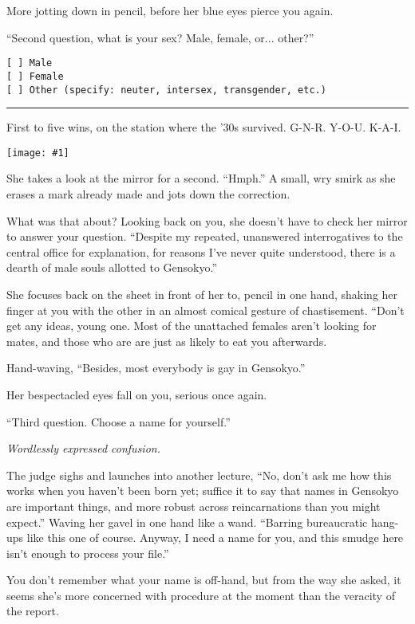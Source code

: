 \documentclass[a4paper,12pt]{book}
\newenvironment{commentary}%
	{
		\vfill%
		\hrule%
		\begin{footnotesize}%
		\color{MidnightBlue}%
	}%
	{%
		\end{footnotesize}%
	}
\newcommand{\img}[1]{%
	\texttt{[image: \#1]}%
}
\begin{document}
More jotting down in pencil, before her blue eyes pierce you again.

``Second question, what is your sex? Male, female, or... other?''

\begin{verbatim}
[ ] Male
[ ] Female
[ ] Other (specify: neuter, intersex, transgender, etc.)
\end{verbatim}

\begin{commentary}
First to five wins, on the station where the '30s survived. G-N-R. Y-O-U. K-A-I.
\end{commentary}



\newpage

\img{siki-three}

She takes a look at the mirror for a second. ``Hmph.'' A small, wry smirk as she erases a mark already made and jots down the correction.

What was that about? Looking back on you, she doesn't have to check her mirror to answer your question. ``Despite my repeated, unanswered interrogatives to the central office for explanation, for reasons I've never quite understood, there is a dearth of male souls allotted to Gensokyo.''

She focuses back on the sheet in front of her to, pencil in one hand, shaking her finger at you with the other in an almost comical gesture of chastisement. ``Don't get any ideas, young one. Most of the unattached females aren't looking for mates, and those who are are just as likely to eat you afterwards.

Hand-waving, ``Besides, most everybody is gay in Gensokyo.''

Her bespectacled eyes fall on you, serious once again.

``Third question. Choose a name for yourself.''

\emph{Wordlessly expressed confusion.}

The judge sighs and launches into another lecture, ``No, don't ask me how this works when you haven't been born yet; suffice it to say that names in Gensokyo are important things, and more robust across reincarnations than you might expect.'' Waving her gavel in one hand like a wand. ``Barring bureaucratic hang-ups like this one of course. Anyway, I need a name for you, and this smudge here isn't enough to process your file.''

You don't remember what your name is off-hand, but from the way she asked, it seems she's more concerned with procedure at the moment than the veracity of the report.
\end{document}
